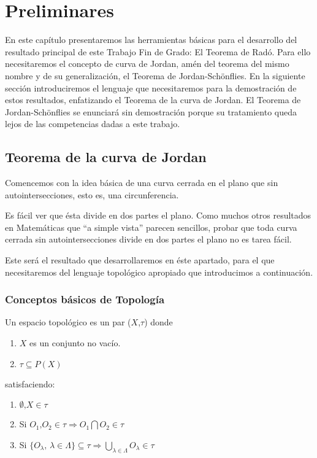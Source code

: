 \chapter{Preliminares}

En este capítulo presentaremos las herramientas básicas para el desarrollo del resultado principal de este Trabajo Fin de Grado: El Teorema de Radó. Para ello necesitaremos el concepto de curva de Jordan, amén del teorema del mismo nombre y de su generalización, el Teorema de Jordan-Schönflies. En la siguiente sección introduciremos el lenguaje que necesitaremos para la demostración de estos resultados, enfatizando el Teorema de la curva de Jordan. El Teorema de Jordan-Schönflies se enunciará sin demostración porque su tratamiento queda lejos de las competencias dadas a este trabajo.

\section{Teorema de la curva de Jordan}

Comencemos con la idea básica de una curva cerrada en el plano que sin autointersecciones, esto es, una circunferencia.

Es fácil ver   que  ésta divide en dos partes el plano. Como muchos otros resultados en Matemáticas que ``a simple vista'' parecen sencillos, probar que toda curva cerrada sin autointersecciones divide en dos partes el plano no es tarea fácil.

Este será el resultado que desarrollaremos en éste apartado, para el que necesitaremos del lenguaje topológico apropiado que introducimos a continuación.

\subsection{Conceptos básicos de Topología}

\begin{definition}
	Un espacio topológico es un par ($X$,$\tau$) donde
	\begin{enumerate}
		\item  $X$ es un conjunto no vacío.
		\item $\tau \subseteq \mathit{P}(X)$
	\end{enumerate}
	satisfaciendo:
	\begin{enumerate}
		\item $\emptyset \text{,} X \in \tau$
		\item Si $O_1 \text{,} O_2 \in \tau \Longrightarrow O_1 \bigcap O_2 \in \tau$
		\item Si $\{ O_\lambda \text{, } \lambda \in \Lambda \} \subseteq \tau \Longrightarrow \bigcup_{\lambda \in \Lambda} O_\lambda \in \tau$
	\end{enumerate}
\end{definition}


